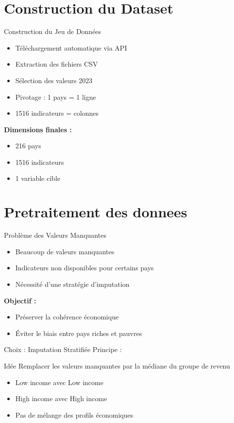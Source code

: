 \documentclass{beamer}
\begin{document}
\section{Construction du Dataset}

\begin{frame}{Construction du Jeu de Données}
\begin{itemize}
\item Téléchargement automatique via API
\item Extraction des fichiers CSV
\item Sélection des valeurs 2023
\item Pivotage : 1 pays = 1 ligne
\item 1516 indicateurs = colonnes
\end{itemize}

\vspace{0.5cm}

\textbf{Dimensions finales :}
\begin{itemize}
\item 216 pays
\item 1516 indicateurs
\item 1 variable cible
\end{itemize}
\end{frame}

\section{Pretraitement des donnees}
\begin{frame}{Problème des Valeurs Manquantes}
\begin{itemize}
\item Beaucoup de valeurs manquantes
\item Indicateurs non disponibles pour certains pays
\item Nécessité d'une stratégie d'imputation
\end{itemize}


\textbf{Objectif :}
\begin{itemize}
\item Préserver la cohérence économique
\item Éviter le biais entre pays riches et pauvres
\end{itemize}

\end{frame}

\begin{frame}{Choix : Imputation Stratifiée}
Principe :

\begin{block}{Idée}
Remplacer les valeurs manquantes par la médiane du groupe de revenu
\end{block}

\begin{itemize}
\item Low income avec Low income
\item High income avec High income
\item Pas de mélange des profils économiques
\end{itemize}

\end{frame}
\end{document}
